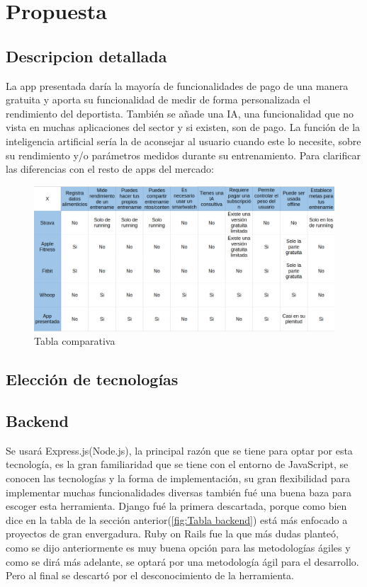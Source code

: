 \chapter{Propuesta}

\section{Descripcion detallada}

La app presentada daría la mayoría de funcionalidades de pago de una manera gratuita y aporta su funcionalidad de medir de forma personalizada el rendimiento del deportista. También se añade una IA, una funcionalidad que no vista en muchas aplicaciones del sector y si existen, son de pago. La función de la inteligencia artificial sería la de aconsejar al usuario cuando este lo necesite, sobre su rendimiento y/o parámetros medidos durante su entrenamiento.
Para clarificar las diferencias con el resto de apps del mercado:

\begin{landscape}
\begin{figure}[H]
   \centering
    \includegraphics[width=1.65\textwidth]{tablas/tabla.png}
    \caption{Tabla comparativa}
    \label{fig:Tabla comparativa}
\end{figure} 
\end{landscape}

\section{Elección de tecnologías}

\section{Backend}

Se usará Express.js(Node.js), la principal razón que se tiene para optar por esta tecnología, es la gran familiaridad que se tiene con el entorno de JavaScript, se conocen las tecnologías y la forma de implementación, su gran flexibilidad para implementar muchas funcionalidades diversas también fué una buena baza para escoger esta herramienta.
Django fué la primera descartada, porque como bien dice en la tabla de la sección anterior(\cref{fig:Tabla backend}) está más enfocado a proyectos de gran envergadura.
Ruby on Rails fue la que más dudas planteó, como se dijo anteriormente es muy buena opción para las metodologías ágiles y como se dirá más adelante, se optará por una metodología ágil para el desarrollo. Pero al final se descartó por el desconocimiento de la herramienta.

